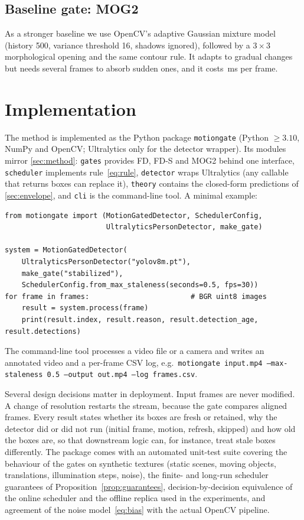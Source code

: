 \documentclass[12pt,a4paper]{article}
\theoremstyle{plain}
\theoremstyle{definition}
\newcommand{\code}[1]{\texttt{#1}}
\newcommand{\FD}{FD}
\newcommand{\FDS}{FD-S}
\begin{document}
\subsection{Baseline gate: MOG2}\label{sec:mog}
As a stronger baseline we use OpenCV's adaptive Gaussian mixture model~\cite{zivkovic2004improved} (history 500, variance threshold 16, shadows ignored), followed by a $3\times3$ morphological opening and the same contour rule. It adapts to gradual changes but needs several frames to absorb sudden ones, and it costs \GateMsMOG\,ms per frame.


\newpage

\section{Implementation}\label{sec:implementation}

The method is implemented as the Python package \code{motiongate} (Python $\ge3.10$, NumPy and OpenCV; Ultralytics only for the detector wrapper). Its modules mirror \cref{sec:method}: \code{gates} provides \FD, \FDS{} and MOG2 behind one interface, \code{scheduler} implements rule~\eqref{eq:rule}, \code{detector} wraps Ultralytics (any callable that returns boxes can replace it), \code{theory} contains the closed-form predictions of \cref{sec:envelope}, and \code{cli} is the command-line tool. A minimal example:

\begin{lstlisting}
from motiongate import (MotionGatedDetector, SchedulerConfig,
                        UltralyticsPersonDetector, make_gate)

system = MotionGatedDetector(
    UltralyticsPersonDetector("yolov8m.pt"),
    make_gate("stabilized"),
    SchedulerConfig.from_max_staleness(seconds=0.5, fps=30))
for frame in frames:                        # BGR uint8 images
    result = system.process(frame)
    print(result.index, result.reason, result.detection_age, result.detections)
\end{lstlisting}

\noindent The command-line tool processes a video file or a camera and writes an annotated video and a per-frame CSV log, e.g.\ \code{motiongate input.mp4 --max-staleness 0.5 --output out.mp4 --log frames.csv}.

Several design decisions matter in deployment. Input frames are never modified. A change of resolution restarts the stream, because the gate compares aligned frames. Every result states whether its boxes are fresh or retained, why the detector did or did not run (initial frame, motion, refresh, skipped) and how old the boxes are, so that downstream logic can, for instance, treat stale boxes differently. The package comes with an automated unit-test suite covering the behaviour of the gates on synthetic textures (static scenes, moving objects, translations, illumination steps, noise), the finite- and long-run scheduler guarantees of Proposition~\ref{prop:guarantees}, decision-by-decision equivalence of the online scheduler and the offline replica used in the experiments, and agreement of the noise model~\eqref{eq:bias} with the actual OpenCV pipeline.
\end{document}
